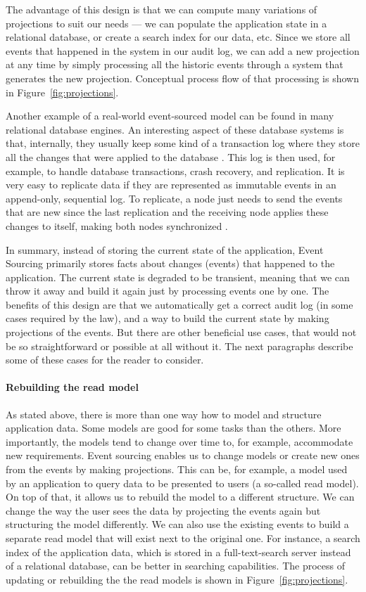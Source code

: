\documentclass{book}
\begin{document}
The advantage of this design is that we can compute many variations of
projections to suit our needs --- we can populate the application state
in a relational database, or create a search index for our data, etc.
Since we store all events that happened in the system in our audit log,
we can add a new projection at any time by simply processing all the
historic events through a system that generates the new projection.
Conceptual process flow of that processing is shown in Figure~\ref{fig:projections}.

Another example of a real-world event-sourced model can be found in many
relational database engines. An interesting aspect of these database
systems is that, internally, they usually keep some kind of a
transaction log where they store all the changes that were applied to
the database \cite{cqrsnu-eventsourcing}. This log is then used, for
example, to handle database transactions, crash recovery, and
replication. It is very easy to replicate data if they are represented
as immutable events in an append-only, sequential log. To replicate, a
node just needs to send the events that are new since the last
replication and the receiving node applies these changes to itself,
making both nodes synchronized \cite{replica}.

In summary, instead of storing the current state of the application,
Event Sourcing primarily stores facts about changes (events) that
happened to the application. The current state is degraded to be
transient, meaning that we can throw it away and build it again just by
processing events one by one. The benefits of this design are that we
automatically get a correct audit log (in some cases required by the
law), and a way to build the current state by making projections of the
events. But there are other beneficial use cases, that would not be so
straightforward or possible at all without it. The next paragraphs
describe some of these cases for the reader to consider.


\paragraph{Rebuilding the read model}\label{rebuilding-the-read-model}

As stated above, there is more than one way how to model and structure
application data. Some models are good for some tasks than the others.
More importantly, the models tend to change over time to, for example,
accommodate new requirements. Event sourcing enables us to change models
or create new ones from the events by making projections. This can be,
for example, a model used by an application to query data to be
presented to users (a so-called read model). On top of that, it allows
us to rebuild the model to a different structure. We can change the way
the user sees the data by projecting the events again but structuring
the model differently. We can also use the existing events to build a
separate read model that will exist next to the original one. For
instance, a search index of the application data, which is stored in a
full-text-search server instead of a relational database, can be better
in searching capabilities. The process of updating or rebuilding the the
read models is shown in Figure~\ref{fig:projections}.
\end{document}
